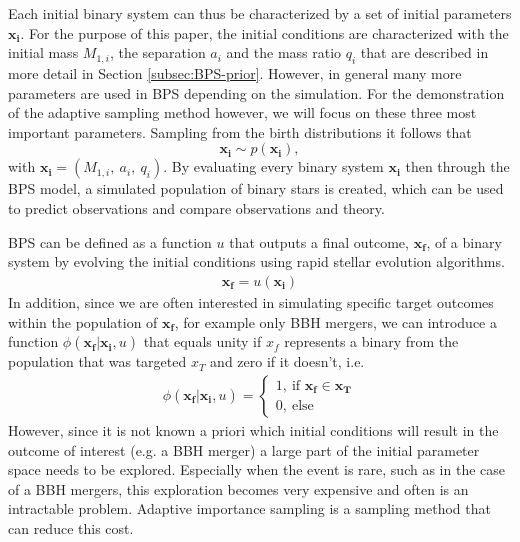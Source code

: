 \documentclass[a4paper,fleqn,usenatbib]{mnras}
\begin{document}
Each initial binary system can thus be characterized by a set of initial parameters $\mathbf{x_i}$. 
For the purpose of this paper, the initial conditions are characterized with the initial mass $M_{1,i}$, the separation $a_i$ and the mass ratio $q_i$ that are  described in more detail in Section \ref{subsec:BPS-prior}. However, in general many more parameters are used in BPS  depending on the simulation. For the demonstration of the adaptive sampling method however, we will focus on these three most important parameters. Sampling from the birth distributions it follows that 
%
\begin{equation}
\mathbf{x_i} \sim p(\mathbf{x_i}), 
\end{equation}
%
with $\mathbf{x_i} = (M_{1,i},\ a_i, \ q_i)$.  
By evaluating every binary system $\mathbf{x_i} $ then through the BPS model, a simulated population of binary stars is  created, which can  be used to predict observations and compare observations and theory.  

BPS can be defined as a function $u$ that outputs a final outcome,  $\mathbf{x_f}$, of a binary system by evolving the initial conditions using rapid stellar evolution algorithms. 
%
\begin{align*}
\mathbf{x_f} = u(\mathbf{x_i})
\end{align*} 
%
In addition, since we are often interested in simulating specific target outcomes within the population of $\mathbf{x_f}$, for example only BBH mergers, we can introduce a function $\phi(\mathbf{x_f} | \mathbf{x_i}, u)$ that equals unity if $x_f$ represents a binary from the population that was targeted $x_T$  and zero if it doesn't, i.e. 
%
 \begin{align*}
 \phi(\mathbf{x_f} | \mathbf{x_i}, u) = \begin{cases}    1, \ \text{if } \mathbf{ x_f} \in   \mathbf{x_T}    \\ 0, \   \text{else}   \end{cases}
 \end{align*} 
% 
However, since it is not known a priori which initial conditions will result in the outcome of interest (e.g. a BBH merger) a large part of the initial parameter space needs to be explored. Especially when the event is rare, such as in the case of a BBH mergers, this exploration becomes very expensive and often is an intractable problem. Adaptive importance sampling  is a sampling method that can reduce this cost. 
\end{document}
